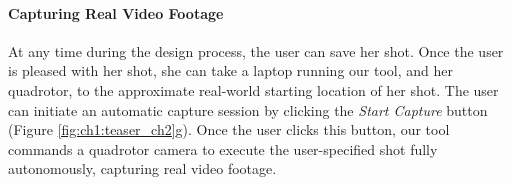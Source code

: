 \paragraph{Capturing Real Video Footage}

At any time during the design process, the user can save her shot.
Once the user is pleased with her shot, she can take a laptop running our tool, and her quadrotor, to the approximate real-world starting location of her shot.
The user can initiate an automatic capture session by clicking the \emph{Start Capture} button (Figure \ref{fig:ch1:teaser_ch2}g).
Once the user clicks this button, our tool commands a quadrotor camera to execute the user-specified shot fully autonomously, capturing real video footage.
